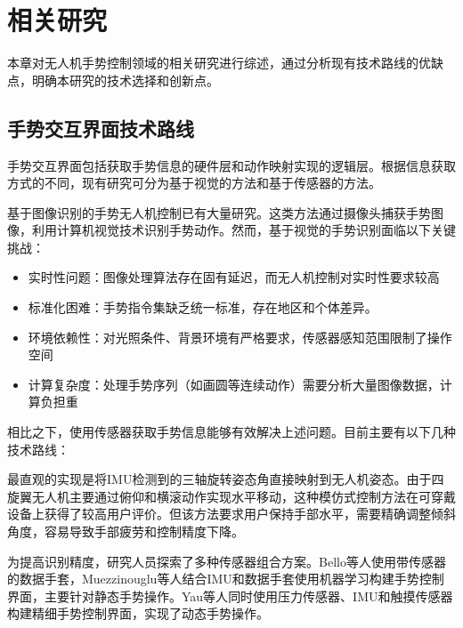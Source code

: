 \ifx\allfiles\undefined


\else
\fi

\section{相关研究}

本章对无人机手势控制领域的相关研究进行综述，通过分析现有技术路线的优缺点，明确本研究的技术选择和创新点。

\subsection{手势交互界面技术路线}

手势交互界面包括获取手势信息的硬件层和动作映射实现的逻辑层。根据信息获取方式的不同，现有研究可分为基于视觉的方法和基于传感器的方法。

基于图像识别的手势无人机控制已有大量研究\cite{patrona2021overview,nguyen2024pose,kim2020comparative}。这类方法通过摄像头捕获手势图像，利用计算机视觉技术识别手势动作。然而，基于视觉的手势识别面临以下关键挑战：
\begin{itemize}
    \item 实时性问题：图像处理算法存在固有延迟，而无人机控制对实时性要求较高
    \item 标准化困难：手势指令集缺乏统一标准，存在地区和个体差异。
    \item 环境依赖性：对光照条件、背景环境有严格要求，传感器感知范围限制了操作空间
    \item 计算复杂度：处理手势序列（如画圆等连续动作）需要分析大量图像数据，计算负担重
\end{itemize}

相比之下，使用传感器获取手势信息能够有效解决上述问题。目前主要有以下几种技术路线：

最直观的实现是将IMU检测到的三轴旋转姿态角直接映射到无人机姿态\cite{mughees2020gesture,budiyanto2021navigation,muezzinouglu2021intelligent,lee2023wearable,cherpillod2019embodied,kim2022intuitive}。由于四旋翼无人机主要通过俯仰和横滚动作实现水平移动，这种模仿式控制方法在可穿戴设备上获得了较高用户评价\cite{kim2022intuitive,lee2023wearable}。但该方法要求用户保持手部水平，需要精确调整倾斜角度，容易导致手部疲劳和控制精度下降。

为提高识别精度，研究人员探索了多种传感器组合方案。Bello等人使用带传感器的数据手套\cite{bello2023captainglove}，Muezzinouglu等人结合IMU和数据手套使用机器学习构建手势控制界面\cite{muezzinouglu2021intelligent}，主要针对静态手势操作。Yau等人\cite{yau2020subtle}同时使用压力传感器、IMU和触摸传感器构建精细手势控制界面，实现了动态手势操作。

